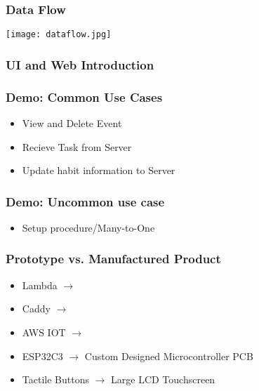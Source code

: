 \documentclass{beamer}
\begin{document}
\frame{\titlepage}

\begin{frame}
  \frametitle{Data Flow}
    \begin{center}
        \texttt{[image: dataflow.jpg]}
    \end{center}
\end{frame}

\begin{frame}
  \frametitle{UI and Web Introduction}
\end{frame}

\begin{frame}
  \frametitle{Demo: Common Use Cases}
  \begin{itemize}
    \item View and Delete Event
    \item Recieve Task from Server
    \item Update habit information to Server
  \end{itemize}
\end{frame}

\begin{frame}
  \frametitle{Demo: Uncommon use case}
  \begin{itemize}
    \item Setup procedure/Many-to-One
  \end{itemize}
\end{frame}

\begin{frame}
  \frametitle{Prototype vs. Manufactured Product}
  \begin{itemize}
    \item Lambda \(\rightarrow\)
    \item Caddy \(\rightarrow\)
    \item AWS IOT \(\rightarrow\)
    \item ESP32C3 \(\rightarrow\) Custom Designed Microcontroller PCB
    \item Tactile Buttons \(\rightarrow\) Large LCD Touchscreen
  \end{itemize}
\end{frame}
\end{document}
